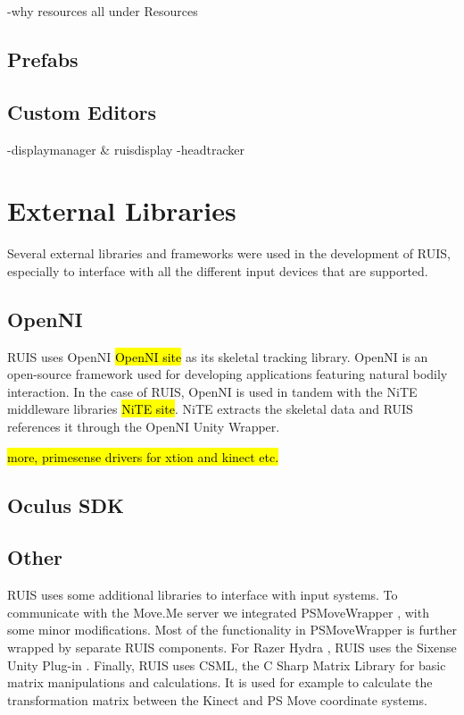 \documentclass[12pt,a4paper,oneside,pdftex]{report}
\begin{document}
-why resources all under Resources

\subsection{Prefabs}
\label{subsection:systemarchitecture:prefabs}



\subsection{Custom Editors}
\label{subsection:systemarchitecture:customeditors}

-displaymanager & ruisdisplay
-headtracker


\section{External Libraries}
\label{section:externallibraries}

Several external libraries and frameworks were used in the development of RUIS, especially to interface with all the different input devices that are supported. 

\subsection{OpenNI}
\label{subsection:external:openni}

RUIS uses OpenNI \hl{OpenNI site} as its skeletal tracking library. OpenNI is an open-source framework used for developing applications featuring natural bodily interaction. In the case of RUIS, OpenNI is used in tandem with the NiTE middleware libraries \hl{NiTE site}. NiTE extracts the skeletal data and RUIS references it through the OpenNI Unity Wrapper. 

\hl{more, primesense drivers for xtion and kinect etc.}

\subsection{Oculus SDK}
\label{subsection:external:oculussdk}

\subsection{Other}
\label{subsection:external:other}

RUIS uses some additional libraries to interface with input systems. To communicate with the Move.Me server we integrated PSMoveWrapper \cite{PSMoveWrapper}, with some minor modifications. Most of the functionality in PSMoveWrapper is further wrapped by separate RUIS components. For Razer Hydra \cite{RazerHydra}, RUIS uses the Sixense Unity Plug-in \cite{RazerUnityPlugin}. Finally, RUIS uses CSML, the C Sharp Matrix Library for basic matrix manipulations and calculations. It is used for example to calculate the transformation matrix between the Kinect and PS Move coordinate systems.
\end{document}
